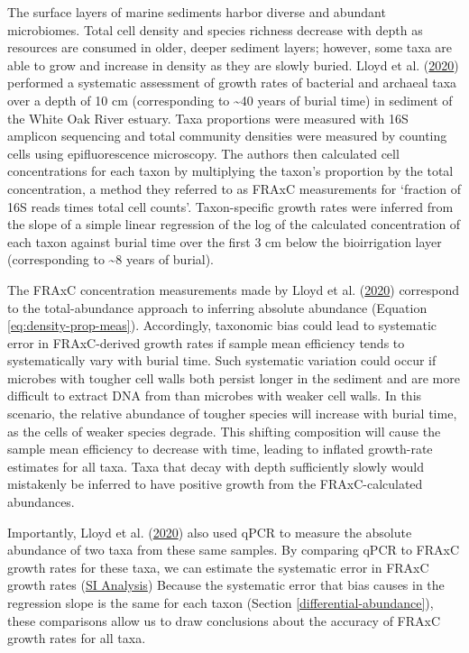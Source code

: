 \documentclass[
]{article}
\begin{document}
The surface layers of marine sediments harbor diverse and abundant microbiomes.
Total cell density and species richness decrease with depth as resources are consumed in older, deeper sediment layers; however, some taxa are able to grow and increase in density as they are slowly buried.
Lloyd et al. (\protect\hyperlink{ref-lloyd2020evid}{2020}) performed a systematic assessment of growth rates of bacterial and archaeal taxa over a depth of 10 cm (corresponding to \textasciitilde40 years of burial time) in sediment of the White Oak River estuary.
Taxa proportions were measured with 16S amplicon sequencing and total community densities were measured by counting cells using epifluorescence microscopy.
The authors then calculated cell concentrations for each taxon by multiplying the taxon's proportion by the total concentration, a method they referred to as FRAxC measurements for `fraction of 16S reads times total cell counts'.
Taxon-specific growth rates were inferred from the slope of a simple linear regression of the log of the calculated concentration of each taxon against burial time over the first 3 cm below the bioirrigation layer (corresponding to \textasciitilde8 years of burial).

The FRAxC concentration measurements made by Lloyd et al. (\protect\hyperlink{ref-lloyd2020evid}{2020}) correspond to the total-abundance approach to inferring absolute abundance (Equation \eqref{eq:density-prop-meas}).
Accordingly, taxonomic bias could lead to systematic error in FRAxC-derived growth rates if sample mean efficiency tends to systematically vary with burial time.
Such systematic variation could occur if microbes with tougher cell walls both persist longer in the sediment and are more difficult to extract DNA from than microbes with weaker cell walls.
In this scenario, the relative abundance of tougher species will increase with burial time, as the cells of weaker species degrade.
This shifting composition will cause the sample mean efficiency to decrease with time, leading to inflated growth-rate estimates for all taxa.
Taxa that decay with depth sufficiently slowly would mistakenly be inferred to have positive growth from the FRAxC-calculated abundances.

Importantly, Lloyd et al. (\protect\hyperlink{ref-lloyd2020evid}{2020}) also used qPCR to measure the absolute abundance of two taxa from these same samples.
By comparing qPCR to FRAxC growth rates for these taxa, we can estimate the systematic error in FRAxC growth rates (\href{https://mikemc.github.io/differential-abundance-theory/notebook/posts/2022-01-08-lloyd2020evi-case-study/}{SI Analysis})
Because the systematic error that bias causes in the regression slope is the same for each taxon (Section \ref{differential-abundance}), these comparisons allow us to draw conclusions about the accuracy of FRAxC growth rates for all taxa.
\end{document}
